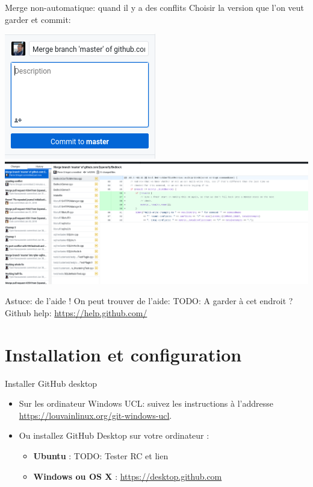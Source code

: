 \documentclass{beamer}
\begin{document}
\begin{frame}{Merge non-automatique: quand il y a des conflits}
    Choisir la version que l'on veut garder et commit:\\
    \begin{center}
	 	   \includegraphics[scale=0.4]{img/github_desktop/conflit_4.png}\\
	 	   \includegraphics[scale=0.2]{img/github_desktop/conflit_5.png}
    \end{center}
\end{frame}

\begin{frame}{Astuce: de l'aide !}
    On peut trouver de l'aide:
    TODO: A garder à cet endroit ?
        Github help: \url{https://help.github.com/}
\end{frame}


\section{Installation et configuration}

\begin{frame}{Installer GitHub desktop}
\begin{itemize}
    \item Sur les ordinateur Windows UCL: suivez les instructions à l'addresse {\small\url{https://louvainlinux.org/git-windows-ucl}}.
    \item Ou installez GitHub Desktop sur votre ordinateur :
    \begin{itemize}
        \item \textbf{Ubuntu} : TODO: Tester RC et lien
        \item \textbf{Windows ou OS X} : \url{https://desktop.github.com}
    \end{itemize}
\end{itemize}
\end{frame}
\end{document}
